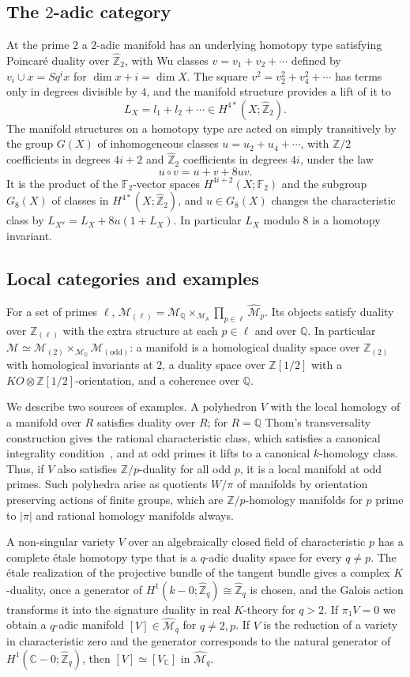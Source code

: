 \documentclass[11pt]{amsart}
\theoremstyle{plain}
\theoremstyle{definition}
\numberwithin{equation}{section}
\newcommand{\Z}{\mathbb{Z}}
\newcommand{\Q}{\mathbb{Q}}
\newcommand{\C}{\mathbb{C}}
\newcommand{\F}{\mathbb{F}}
\newcommand{\Zhat}{\widehat{\mathbb{Z}}}
\newcommand{\Zl}{\mathbb{Z}_{(\ell)}}
\newcommand{\KO}{\mathit{KO}}
\begin{document}
\subsection{The $2$-adic category}
At the prime $2$ a $2$-adic manifold has an underlying homotopy type satisfying Poincar\'e duality over $\Zhat_2$, with Wu classes $v=v_1+v_2+\cdots$ defined by $v_i\cup x=Sq^ix$ for $\dim x+i=\dim X$.
The square $v^2=v_2^2+v_4^2+\cdots$ has terms only in degrees divisible by $4$, and the manifold structure provides a lift of it to
\[
L_X=l_1+l_2+\cdots\in H^{4*}(X;\Zhat_2).
\]
The manifold structures on a homotopy type are acted on simply transitively by the group $G(X)$ of inhomogeneous classes $u=u_2+u_4+\cdots$, with $\Z/2$ coefficients in degrees $4i+2$ and $\Zhat_2$ coefficients in degrees $4i$, under the law
\[
u\circ v=u+v+8uv.
\]
It is the product of the $\F_2$-vector spaces $H^{4i+2}(X;\F_2)$ and the subgroup $G_8(X)$ of classes in $H^{4*}(X;\Zhat_2)$, and $u\in G_8(X)$ changes the characteristic class by $L_{X^u}=L_X+8u(1+L_X)$.
In particular $L_X$ modulo $8$ is a homotopy invariant.

\subsection{Local categories and examples}
For a set of primes $\ell$, $\mathcal M_{(\ell)}=\mathcal M_\Q\times_{\mathcal M_{\mathbb A}}\prod_{p\in\ell}\widehat{\mathcal M}_p$.
Its objects satisfy duality over $\Zl$ with the extra structure at each $p\in\ell$ and over $\Q$.
In particular $\mathcal M\simeq\mathcal M_{(2)}\times_{\mathcal M_\Q}\mathcal M_{(\mathrm{odd})}$: a manifold is a homological duality space over $\Z_{(2)}$ with homological invariants at $2$, a duality space over $\Z[1/2]$ with a $\KO\otimes\Z[1/2]$-orientation, and a coherence over $\Q$.

We describe two sources of examples.
A polyhedron $V$ with the local homology of a manifold over $R$ satisfies duality over $R$; for $R=\Q$ Thom's transversality construction gives the rational characteristic class, which satisfies a canonical integrality condition~\cite{MS74}, and at odd primes it lifts to a canonical $k$-homology class.
Thus, if $V$ also satisfies $\Z/p$-duality for all odd $p$, it is a local manifold at odd primes.
Such polyhedra arise as quotients $W/\pi$ of manifolds by orientation preserving actions of finite groups, which are $\Z/p$-homology manifolds for $p$ prime to $|\pi|$ and rational homology manifolds always.

A non-singular variety $V$ over an algebraically closed field of characteristic $p$ has a complete \'etale homotopy type that is a $q$-adic duality space for every $q\ne p$.
The \'etale realization of the projective bundle of the tangent bundle gives a complex $K$-duality, once a generator of $H^1(k-0;\Zhat_q)\cong\Zhat_q$ is chosen, and the Galois action transforms it into the signature duality in real $K$-theory for $q>2$.
If $\pi_1V=0$ we obtain a $q$-adic manifold $[V]\in\widehat{\mathcal M}_q$ for $q\ne2,p$.
If $V$ is the reduction of a variety in characteristic zero and the generator corresponds to the natural generator of $H^1(\C-0;\Zhat_q)$, then $[V]\simeq[V_\C]$ in $\widehat{\mathcal M}_q$.
\end{document}
